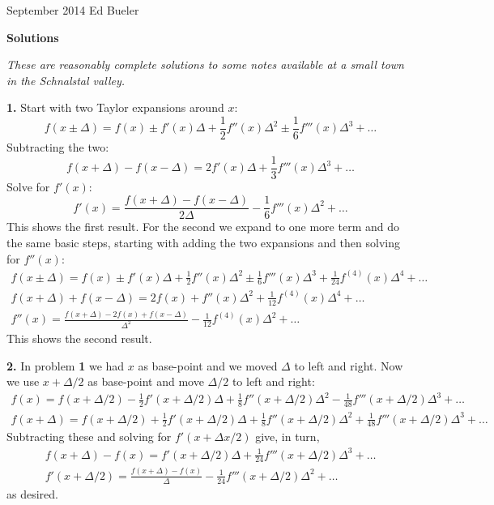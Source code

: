 \documentclass[10pt]{amsart}
\newcommand{\normalspacing}{\renewcommand{\baselinestretch}{1.05}
        \tiny\normalsize}
\newcommand{\prob}[1]{\bigskip\noindent\large\textbf{#1.}\normalsize }
\begin{document}
\scriptsize
\noindent September 2014 \hfill Ed Bueler

\vspace{10mm}

\Large\centerline{\textbf{Solutions}}

\medskip
\small
\centerline{\emph{These are reasonably complete solutions to some notes available at a small town in the Schnalstal valley.}}
\normalsize

\bigskip\bigskip

\thispagestyle{empty}
\normalspacing

\prob{1}  Start with two Taylor expansions around $x$:
    $$f(x\pm \Delta) = f(x) \pm f'(x) \Delta + \frac{1}{2} f''(x) \Delta^2 \pm \frac{1}{6} f'''(x) \Delta^3 + \dots$$
Subtracting the two:
    $$f(x+\Delta) - f(x-\Delta) = 2 f'(x) \Delta + \frac{1}{3} f'''(x) \Delta^3 + \dots$$
Solve for $f'(x)$:
    $$f'(x) = \frac{f(x+\Delta) - f(x-\Delta)}{2\Delta} - \frac{1}{6} f'''(x) \Delta^2 + \dots$$
This shows the first result.  For the second we expand to one more term and do the same basic steps, starting with adding the two expansions and then solving for $f''(x)$:
\begin{gather*}
    f(x\pm \Delta) = f(x) \pm f'(x) \Delta + \frac{1}{2} f''(x) \Delta^2 \pm \frac{1}{6} f'''(x) \Delta^3 + \frac{1}{24} f^{(4)}(x) \Delta^4 + \dots \\
    f(x + \Delta) + f(x - \Delta) = 2 f(x) + f''(x) \Delta^2 + \frac{1}{12} f^{(4)}(x) \Delta^4 + \dots \\
    f''(x) = \frac{f(x + \Delta) - 2 f(x) + f(x - \Delta)}{\Delta^2} - \frac{1}{12} f^{(4)}(x) \Delta^2 + \dots
\end{gather*}
This shows the second result.

\prob{2}  In problem \textbf{1} we had $x$ as base-point and we moved $\Delta$ to left and right.  Now we use $x+\Delta/2$ as base-point and move $\Delta/2$ to left and right:
\begin{gather*}
f(x) = f(x+\Delta/2) - \frac{1}{2} f'(x+\Delta/2) \Delta + \frac{1}{8} f''(x+\Delta/2) \Delta^2 - \frac{1}{48} f'''(x+\Delta/2) \Delta^3 + \dots \\
f(x+\Delta) = f(x+\Delta/2) + \frac{1}{2} f'(x+\Delta/2) \Delta + \frac{1}{8} f''(x+\Delta/2) \Delta^2 + \frac{1}{48} f'''(x+\Delta/2) \Delta^3 + \dots
\end{gather*}
Subtracting these and solving for $f'(x+\Delta x/2)$ give, in turn,
\begin{gather*}
f(x+\Delta) - f(x) = f'(x+\Delta/2) \Delta + \frac{1}{24} f'''(x+\Delta/2) \Delta^3 + \dots \\
f'(x+\Delta/2) = \frac{f(x+\Delta) - f(x)}{\Delta} - \frac{1}{24} f'''(x+\Delta/2) \Delta^2 + \dots
\end{gather*}
as desired.
\end{document}
